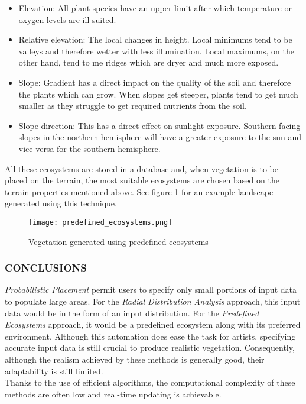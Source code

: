 \begin{itemize}
\item Elevation: All plant species have an upper limit after which temperature or oxygen levels are ill-suited.
\item Relative elevation: The local changes in height. Local minimums tend to be valleys and therefore wetter with less illumination. Local maximums, on the other hand, tend to me ridges which are dryer and much more exposed.
\item Slope: Gradient has a direct impact on the quality of the soil and therefore the plants which can grow. When slopes get steeper, plants tend to get much smaller as they struggle to get required nutrients from the soil.
\item Slope direction: This has a direct effect on sunlight exposure. Southern facing slopes in the northern hemisphere will have a greater exposure to the sun and vice-versa for the southern hemisphere.  
\end{itemize}

All these ecosystems are stored in a database and, when vegetation is to be placed on the terrain, the most suitable ecosystems are chosen based on the terrain properties mentioned above. See figure \ref{Vegetation generated using predefined ecosystems} for an example landscape generated using this technique.

\begin{figure}[h]
  \centering
	\texttt{[image: predefined\_ecosystems.png]}
	\caption{Vegetation generated using predefined ecosystems \cite{Hammes2001}}
	\label{Vegetation generated using predefined ecosystems}
\end{figure}

\subsubsection{CONCLUSIONS}

\textit{Probabilistic Placement} permit users to specify only small portions of input data to populate large areas. For the \textit{Radial Distribution Analysis} approach, this input data would be in the form of an input distribution. For the \textit{Predefined Ecosystems} approach, it would be a predefined ecosystem along with its preferred environment. Although this automation does ease the task for artists, specifying accurate input data is still crucial to produce realistic vegetation. Consequently, although the realism achieved by these methods is generally good, their adaptability is still limited. \\
Thanks to the use of efficient algorithms, the computational complexity of these methods are often low and real-time updating is achievable. 

